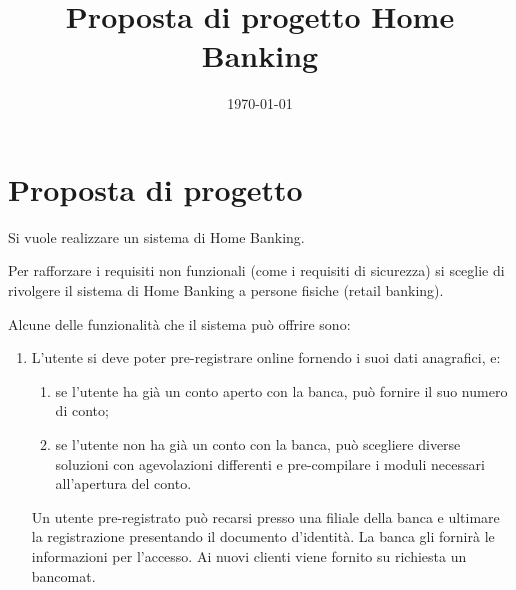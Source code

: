 \documentclass[utf8,draft]{softeng}
\title{Proposta di progetto Home Banking}
\date{\today}
\begin{document}
\maketitle

\section{Proposta di progetto} 

Si vuole realizzare un sistema di Home Banking.

Per rafforzare i requisiti non funzionali (come i requisiti di sicurezza) si sceglie di rivolgere il sistema di Home Banking a persone fisiche (retail banking).

Alcune delle funzionalit\`a che il sistema pu\`o offrire sono:
\begin{enumerate}
	\item L'utente si deve poter pre-registrare online fornendo i suoi dati anagrafici, e:
		\begin{enumerate}
			\item se l'utente ha gi\`a un conto aperto con la banca, pu\`o fornire il suo numero di conto;
			\item se l'utente non ha gi\`a un conto con la banca, pu\`o scegliere diverse soluzioni con agevolazioni differenti e pre-compilare i moduli necessari all'apertura del conto.
		\end{enumerate}
		Un utente pre-registrato pu\`o recarsi presso una filiale della banca e ultimare la registrazione presentando il documento d'identit\`a.
		La banca gli fornir\`a le informazioni per l'accesso.
		Ai nuovi clienti viene fornito su richiesta un bancomat.


\end{enumerate}
\end{document}
